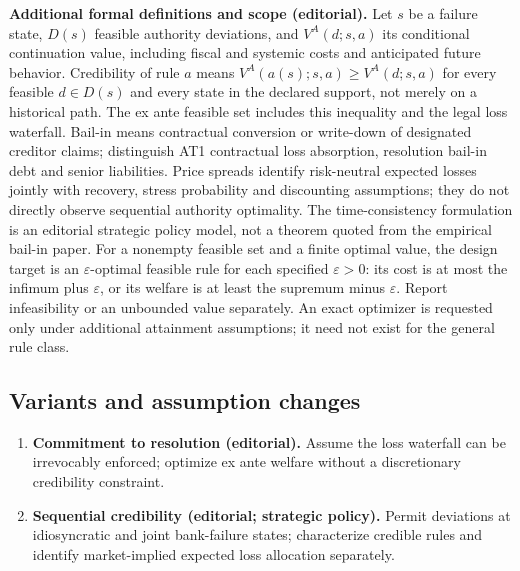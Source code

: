 \documentclass[11pt,a4paper]{article}
\begin{document}
\textbf{Additional formal definitions and scope (editorial).} Let \(s\) be a failure state, \(D(s)\) feasible authority deviations, and \(V^{A}(d;s,a)\) its conditional continuation value, including fiscal and systemic costs and anticipated future behavior. Credibility of rule \(a\) means \(V^{A}(a(s);s,a)\geq V^{A}(d;s,a)\) for every feasible \(d\in D(s)\) and every state in the declared support, not merely on a historical path. The ex ante feasible set includes this inequality and the legal loss waterfall. Bail-in means contractual conversion or write-down of designated creditor claims; distinguish AT1 contractual loss absorption, resolution bail-in debt and senior liabilities. Price spreads identify risk-neutral expected losses jointly with recovery, stress probability and discounting assumptions; they do not directly observe sequential authority optimality. The time-consistency formulation is an editorial strategic policy model, not a theorem quoted from the empirical bail-in paper. For a nonempty feasible set and a finite optimal value, the design target is an \(\varepsilon\)-optimal feasible rule for each specified \(\varepsilon>0\): its cost is at most the infimum plus \(\varepsilon\), or its welfare is at least the supremum minus \(\varepsilon\). Report infeasibility or an unbounded value separately. An exact optimizer is requested only under additional attainment assumptions; it need not exist for the general rule class.
\subsection*{Variants and assumption changes}
\begin{enumerate}
\item \textbf{Commitment to resolution (editorial).} Assume the loss waterfall can be irrevocably enforced; optimize ex ante welfare without a discretionary credibility constraint.
\item \textbf{Sequential credibility (editorial; strategic policy).} Permit deviations at idiosyncratic and joint bank-failure states; characterize credible rules and identify market-implied expected loss allocation separately.
\end{enumerate}
\end{document}
